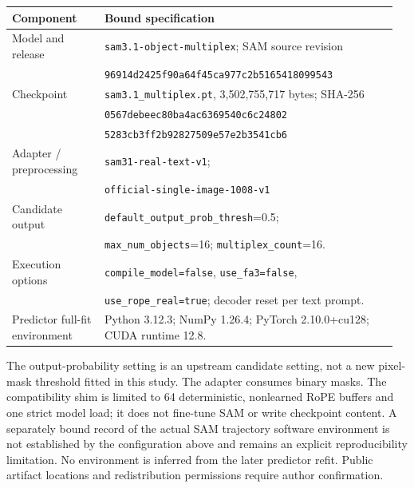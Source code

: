 \begin{center}
\begin{minipage}{\linewidth}
\small
{}
\label{tab:backend-spec}
\begin{tabular}{@{}p{0.23\linewidth}p{0.73\linewidth}@{}}
\toprule
Component & Bound specification \\
\midrule
Model and release & \texttt{sam3.1-object-multiplex}; SAM source revision\\
& \texttt{96914d2425f90a64f45ca977c2b5165418099543} \\
Checkpoint & \texttt{sam3.1\_multiplex.pt}, 3,502,755,717 bytes; SHA-256\\
& \texttt{0567debeec80ba4ac6369540c6c24802}\\[-2pt]
& \texttt{5283cb3ff2b92827509e57e2b3541cb6} \\
Adapter / preprocessing & \texttt{sam31-real-text-v1};\\
& \texttt{official-single-image-1008-v1} \\
Candidate output & \texttt{default\_output\_prob\_thresh}=0.5;\\
& \texttt{max\_num\_objects}=16; \texttt{multiplex\_count}=16.\\
Execution options & \texttt{compile\_model=false}, \texttt{use\_fa3=false},\\
& \texttt{use\_rope\_real=true}; decoder reset per text prompt.\\
Predictor full-fit environment & Python 3.12.3; NumPy 1.26.4; PyTorch 2.10.0+cu128; CUDA runtime 12.8.\\
\bottomrule
\end{tabular}
\par\smallskip
The output-probability setting is an upstream candidate setting, not a new
pixel-mask threshold fitted in this study. The adapter consumes binary
masks. The compatibility shim is limited to 64 deterministic, nonlearned
RoPE buffers and one strict model load; it does not fine-tune SAM or write
checkpoint content. A separately bound record of the actual SAM trajectory
software environment is not established by the configuration above and
remains an explicit reproducibility limitation. No environment is inferred
from the later predictor refit. Public artifact locations and redistribution
permissions require author confirmation.
\end{minipage}
\end{center}
